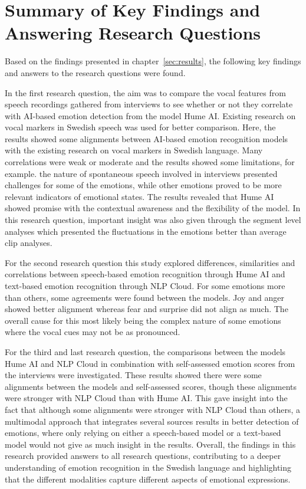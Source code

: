 \section{Summary of Key Findings and Answering Research Questions}
\label{sec:con-key-findings}
Based on the findings presented in chapter~\ref{sec:results}, the following key findings and answers to the research questions were found.

In the first research question, the aim was to compare the vocal features from speech recordings gathered from interviews to see whether or not they correlate with AI-based emotion detection from the model Hume AI. Existing research on vocal markers in Swedish speech was used for better comparison.
Here, the results showed some alignments between AI-based emotion recognition models with the existing research on vocal markers in Swedish language. Many correlations were weak or moderate and the results showed some limitations, for example. the nature of spontaneous speech involved in interviews presented challenges for some of the emotions, while other emotions proved to be more relevant indicators of emotional states. The results revealed that Hume AI showed promise with the contextual awareness and the flexibility of the model. 
In this research question, important insight was also given through the segment level analyses which presented the fluctuations in the emotions better than average clip analyses.

For the second research question this study explored differences, similarities and correlations between speech-based emotion recognition through Hume AI and text-based emotion recognition through NLP Cloud.
For some emotions more than others, some agreements were found between the models. Joy and anger showed better alignment whereas fear and surprise did not align as much. The overall cause for this most likely being the complex nature of some emotions where the vocal cues may not be as pronounced. 

For the third and last research question, the comparisons between the models Hume AI and NLP Cloud in combination with self-assessed emotion scores from the interviews were investigated. These results showed there were some alignments between the models and self-assessed scores, though these alignments were stronger with NLP Cloud than with Hume AI. This gave insight into the fact that although some alignments were stronger with NLP Cloud than others, a multimodal approach that integrates several sources results in better detection of emotions, where only relying on either a speech-based model or a text-based model would not give as much insight in the results.
Overall, the findings in this research provided answers to all research questions, contributing to a deeper understanding of emotion recognition in the Swedish language and highlighting that the different modalities capture different aspects of emotional expressions.
